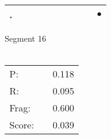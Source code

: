 \documentclass[landscape]{article}
\newcommand{\ssp}{\hspace{2pt}}
\newcommand{\mex}{\cellcolor{g}$\bullet$}
\begin{document}
\begin{tabular}{|l|p{10pt}|p{10pt}|p{10pt}|p{10pt}|p{10pt}|p{10pt}|p{10pt}|p{10pt}|p{10pt}|}
\hline
\ssp \cellcolor{ref8}. \ssp&\hspace{2pt}&\hspace{2pt}&\hspace{2pt}&\hspace{2pt}&\hspace{2pt}&\hspace{2pt}&\hspace{2pt}&\hspace{2pt}&\hspace{2pt}\mex\\
\hline
\end{tabular}

\vspace{6pt}
\noindent Segment 16\\\\
\noindent\begin{tabular}{lm{12pt}r}
\hline
P:&&0.118\\
R:&&0.095\\
Frag:&&0.600\\
Score:&&0.039\\
\end{tabular}

\newpage
\end{document}
